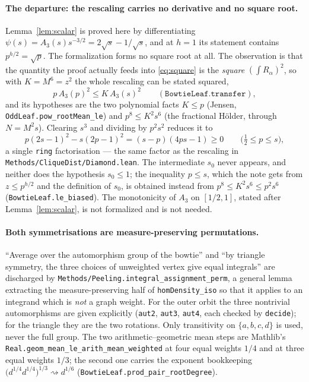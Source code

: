 \documentclass[11pt]{article}
\begin{document}
\paragraph{The departure: the rescaling carries no derivative and no
square root.}
Lemma~\ref{lem:scalar} is proved here by differentiating
$\psi(s)=A_3(s)s^{-3/2}=2\sqrt s-1/\sqrt s$, and at $h=1$ its statement contains
$p^{h/2}=\sqrt p$.  The formalization forms no square root at all.  The
observation is that the quantity the proof actually feeds into \eqref{eq:square}
is the \emph{square} $(\int R_\alpha)^2$, so with $K=M^6=z^2$ the whole
rescaling can be stated squared,
\[
 p\,A_3(p)^2\leq K\,A_3(s)^2
 \qquad(\texttt{BowtieLeaf.transfer}),
\]
and its hypotheses are the two polynomial facts $K\leq p$ (Jensen,
\texttt{OddLeaf.pow\_rootMean\_le}) and $p^8\leq K^2s^6$ (the fractional
Hölder, through $N=M^2s$).  Clearing $s^3$ and dividing by $p^2s^2$ reduces it
to
\begin{equation}
 p(2s-1)^2-s(2p-1)^2=(s-p)(4ps-1)\geq0
 \qquad\bigl(\tfrac12\leq p\leq s\bigr),
 \label{eq:lean-bowtie}
\end{equation}
a single \texttt{ring} factorisation --- the same factor as the rescaling in
\texttt{Methods/CliqueDist/Diamond.lean}.  The intermediate $s_0$ never appears,
and neither does the hypothesis $s_0\leq1$; the inequality $p\leq s$, which the
note gets from $z\leq p^{h/2}$ and the definition of $s_0$, is obtained instead
from $p^8\leq K^2s^6\leq p^2s^6$ (\texttt{BowtieLeaf.le\_biased}).  The
monotonicity of $A_3$ on $[1/2,1]$, stated after Lemma~\ref{lem:scalar}, is not
formalized and is not needed.

\paragraph{Both symmetrisations are measure-preserving permutations.}
``Average over the automorphism group of the bowtie'' and ``by triangle
symmetry, the three choices of unweighted vertex give equal integrals'' are
discharged by \texttt{Methods/Peeling.integral\_assignment\_perm}, a general
lemma extracting the measure-preserving half of \texttt{homDensity\_iso} so
that it applies to an integrand which is \emph{not} a graph weight.  For the
outer orbit the three nontrivial automorphisms are given explicitly
(\texttt{aut2}, \texttt{aut3}, \texttt{aut4}, each checked by \texttt{decide});
for the triangle they are the two rotations.  Only transitivity on
$\{a,b,c,d\}$ is used, never the full group.  The two arithmetic--geometric
mean steps are Mathlib's
\texttt{Real.geom\_mean\_le\_arith\_mean\_weighted} at four equal weights $1/4$
and at three equal weights $1/3$; the second one carries the exponent
bookkeeping $\bigl(d^{1/4}d^{1/4}\bigr)^{1/3}\rightsquigarrow d^{1/6}$
(\texttt{BowtieLeaf.prod\_pair\_rootDegree}).
\end{document}
